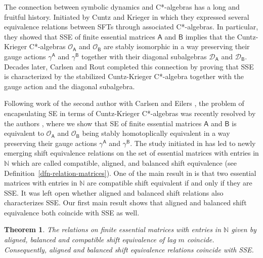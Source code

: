 \documentclass[11pt, letterpaper,final]{amsart}
\newtheorem{theoremintro}{Theorem}
\theoremstyle{definition}
\begin{document}
The connection between symbolic dynamics and C*-algebras has a long and fruitful history.  Initiated by Cuntz and Krieger \cite{CK80, Cu81} in which they expressed several equivalence relations between SFTs through associated C*-algebras. In particular, they showed that SSE of finite essential matrices $\mathsf{A}$ and $\mathsf{B}$ implies that the Cuntz-Krieger C*-algebras $\mathcal{O}_\mathsf{A}$ and $\mathcal{O}_\mathsf{B}$ are stably isomorphic in a way preserving their gauge actions $\gamma^\mathsf{A}$ and $\gamma^\mathsf{B}$ together with their diagonal subalgebras $\mathcal{D}_\mathsf{A}$ and $\mathcal{D}_\mathsf{B}$.  Decades later, Carlsen and Rout \cite{CR} completed this connection by proving that SSE is characterized by the stabilized Cuntz-Krieger C*-algebra together with the gauge action and the diagonal subalgebra.  

Following work of the second author with Carlsen and Eilers \cite{CDE}, the problem of encapsulating SE in terms of Cuntz-Krieger C*-algebras was recently resolved by the authors \cite{BDR+}, where we show that SE of finite essential matrices $\mathsf{A}$ and $\mathsf{B}$ is equivalent to $\mathcal{O}_\mathsf{A}$ and $\mathcal{O}_\mathsf{B}$ being stably homotoplically equivalent in a way preserving their gauge actions $\gamma^\mathsf{A}$ and $\gamma^\mathsf{B}$. The study initiated in \cite{CDE} has led to newly emerging shift equivalence relations on the set of essential matrices with entries in $\mathbb{N}$ which are called compatible, aligned, and balanced shift equivalence (see Definition~\ref{dfn-relation-matrices}). One of the main result in \cite{CDE} is that two essential matrices with entries in $\mathbb{N}$ are compatible shift equivalent if and only if they are SSE. It was left open whether aligned and balanced shift relations also characterizes SSE. Our first main result shows that aligned and balanced shift equivalence both coincide with SSE as well.


\begin{theoremintro}\label{thm_cab}
The relations on finite essential matrices with entries in $\mathbb{N}$ given by aligned, balanced and compatible shift equivalence of lag $m$ coincide. Consequently, aligned and balanced shift equivalence relations coincide with SSE.
 \end{theoremintro}
 
\end{document}
